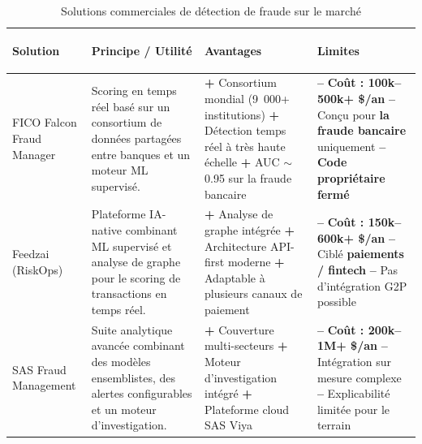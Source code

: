\documentclass[a4paper, oneside, 12pt]{book}
\newcommand{\thead}[1]{\cellcolor{EYdark}\textcolor{white}{\textbf{#1}}}
\renewcommand{\thead}[1]{\cellcolor{EYyellow}\textcolor{EYdark}{\textbf{#1}}}
\begin{document}
\begin{table}[H]
\centering
\caption{Solutions commerciales de détection de fraude sur le marché}
\label{tab:solutions_commerciales}
\renewcommand{\arraystretch}{1.4}
\small
\begin{tabular}{|>{\bfseries\raggedright\arraybackslash}p{2.4cm}|p{3.8cm}|p{4.5cm}|p{4.5cm}|}
\hline
\thead{Solution} & \thead{Principe / Utilité} & \thead{{Avantages}} & \thead{{Limites}} \\
\hline
FICO Falcon Fraud Manager
& Scoring en temps réel basé sur un consortium de données partagées entre banques et un moteur ML supervisé.
& \cellcolor{GreenBG}
  \textcolor{GreenTxt}{\textbf{+}} Consortium mondial (9~000+ institutions) \newline
  \textcolor{GreenTxt}{\textbf{+}} Détection temps réel à très haute échelle \newline
  \textcolor{GreenTxt}{\textbf{+}} AUC $\sim$0.95 sur la fraude bancaire
& 
  \textcolor{RedTxt}{\textbf{--}} \textbf{Coût : 100k--500k+ \$/an }\newline
  \textcolor{RedTxt}{\textbf{--}} Conçu pour \textbf{la fraude bancaire} uniquement \newline
  \textcolor{RedTxt}{\textbf{--}} \textbf{Code propriétaire fermé} \\
\hline

Feedzai (RiskOps)
& Plateforme IA-native combinant ML supervisé et analyse de graphe pour le scoring de transactions en temps réel.
& \cellcolor{GreenBG}
  \textcolor{GreenTxt}{\textbf{+}} Analyse de graphe intégrée \newline
  \textcolor{GreenTxt}{\textbf{+}} Architecture API-first moderne \newline
  \textcolor{GreenTxt}{\textbf{+}} Adaptable à plusieurs canaux de paiement
& 
  \textcolor{RedTxt}{\textbf{--}} \textbf{Coût : 150k--600k+ \$/an} \newline
  \textcolor{RedTxt}{\textbf{--}} Ciblé \textbf{paiements / fintech} \newline
  \textcolor{RedTxt}{\textbf{--}} Pas d'intégration G2P possible \\
\hline

SAS Fraud Management
& Suite analytique avancée combinant des modèles ensemblistes, des alertes configurables et un moteur d'investigation.
& \cellcolor{GreenBG}
  \textcolor{GreenTxt}{\textbf{+}} Couverture multi-secteurs \newline
  \textcolor{GreenTxt}{\textbf{+}} Moteur d'investigation intégré \newline
  \textcolor{GreenTxt}{\textbf{+}} Plateforme cloud SAS Viya
& 
  \textcolor{RedTxt}{\textbf{--}} \textbf{Coût : 200k--1M+ \$/an} \newline
  \textcolor{RedTxt}{\textbf{--}} Intégration sur mesure complexe \newline
  \textcolor{RedTxt}{\textbf{--}} Explicabilité limitée pour le terrain \\
\hline


\end{tabular}
\end{table}
\end{document}
